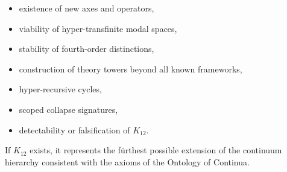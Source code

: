 \begin{itemize}
    \item existence of new axes and operators,
    \item viability of hyper-transfinite modal spaces,
    \item stability of fourth-order distinctions,
    \item construction of theory towers beyond all known frameworks,
    \item hyper-recursive cycles,
    \item scoped collapse signatures,
    \item detectability or falsification of $K_{12}$.
\end{itemize}

If $K_{12}$ exists, it represents the fürthest possible extension of
the continuum hierarchy consistent with the axioms of the Ontology
of Continua.
